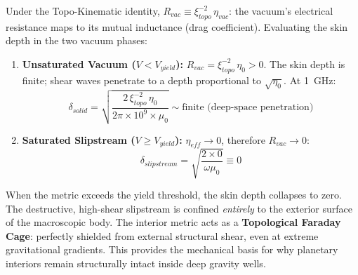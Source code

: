 Under the Topo-Kinematic identity, $R_{vac} \equiv \xi_{topo}^{-2}\, \eta_{vac}$: the vacuum's electrical resistance maps to its mutual inductance (drag coefficient). Evaluating the skin depth in the two vacuum phases:

\begin{enumerate}
    \item \textbf{Unsaturated Vacuum ($V < V_{yield}$):} $R_{vac} = \xi_{topo}^{-2}\, \eta_0 > 0$. The skin depth is finite; shear waves penetrate to a depth proportional to $\sqrt{\eta_0}$. At 1~GHz:
    \begin{equation}
        \delta_{solid} = \sqrt{\frac{2\, \xi_{topo}^{-2}\, \eta_0}{2\pi \times 10^9 \times \mu_0}} \sim \text{finite (deep-space penetration)}
    \end{equation}

    \item \textbf{Saturated Slipstream ($V \geq V_{yield}$):} $\eta_{eff} \to 0$, therefore $R_{vac} \to 0$:
    \begin{equation}
        \delta_{slipstream} = \sqrt{\frac{2 \times 0}{\omega\mu_0}} \equiv 0
    \end{equation}
\end{enumerate}

When the metric exceeds the yield threshold, the skin depth collapses to zero. The destructive, high-shear slipstream is confined \textit{entirely} to the exterior surface of the macroscopic body. The interior metric acts as a \textbf{Topological Faraday Cage}: perfectly shielded from external structural shear, even at extreme gravitational gradients. This provides the mechanical basis for why planetary interiors remain structurally intact inside deep gravity wells.

